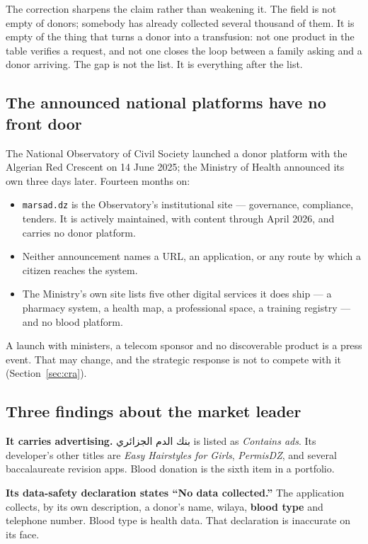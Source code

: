 \documentclass[11pt,a4paper]{article}
\newcommand{\ar}[1]{\textarabic{#1}}
\begin{document}
The correction sharpens the claim rather than weakening it. The field is not
empty of donors; somebody has already collected several thousand of them. It is
empty of the thing that turns a donor into a transfusion: not one product in the
table verifies a request, and not one closes the loop between a family asking
and a donor arriving. The gap is not the list. It is everything after the list.

\subsection{The announced national platforms have no front door}

The National Observatory of Civil Society launched a donor platform with the
Algerian Red Crescent on 14 June 2025; the Ministry of Health announced its own
three days later. Fourteen months on:

\begin{itemize}[leftmargin=1.4em]
  \item \texttt{marsad.dz} is the Observatory's institutional site — governance,
        compliance, tenders. It is actively maintained, with content through
        April 2026, and carries no donor platform.
  \item Neither announcement names a URL, an application, or any route by which
        a citizen reaches the system.
  \item The Ministry's own site lists five other digital services it does ship
        — a pharmacy system, a health map, a professional space, a training
        registry — and no blood platform.
\end{itemize}

A launch with ministers, a telecom sponsor and no discoverable product is a
press event. That may change, and the strategic response is not to compete with
it (Section~\ref{sec:cra}).

\subsection{Three findings about the market leader}

\textbf{It carries advertising.} \ar{بنك الدم الجزائري} is listed as
\emph{Contains ads}. Its developer's other titles are \emph{Easy Hairstyles for
Girls}, \emph{PermisDZ}, and several baccalaureate revision apps. Blood
donation is the sixth item in a portfolio.

\textbf{Its data-safety declaration states ``No data collected.''} The
application collects, by its own description, a donor's name, wilaya,
\textbf{blood type} and telephone number. Blood type is health data. That
declaration is inaccurate on its face.
\end{document}
